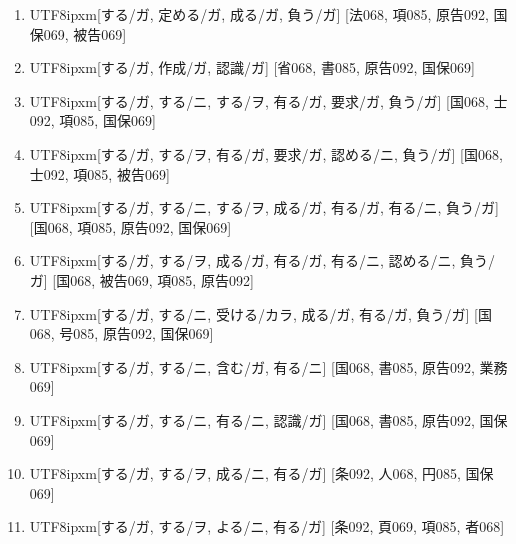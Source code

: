 \begin{enumerate}
\item \begin{CJK}{UTF8}{ipxm}[する/ガ, 定める/ガ, 成る/ガ, 負う/ガ] [法068, 項085, 原告092, 国保069, 被告069]\end{CJK}
\item \begin{CJK}{UTF8}{ipxm}[する/ガ, 作成/ガ, 認識/ガ] [省068, 書085, 原告092, 国保069]\end{CJK}
\item \begin{CJK}{UTF8}{ipxm}[する/ガ, する/ニ, する/ヲ, 有る/ガ, 要求/ガ, 負う/ガ] [国068, 士092, 項085, 国保069]\end{CJK}
\item \begin{CJK}{UTF8}{ipxm}[する/ガ, する/ヲ, 有る/ガ, 要求/ガ, 認める/ニ, 負う/ガ] [国068, 士092, 項085, 被告069]\end{CJK}
\item \begin{CJK}{UTF8}{ipxm}[する/ガ, する/ニ, する/ヲ, 成る/ガ, 有る/ガ, 有る/ニ, 負う/ガ] [国068, 項085, 原告092, 国保069]\end{CJK}
\item \begin{CJK}{UTF8}{ipxm}[する/ガ, する/ヲ, 成る/ガ, 有る/ガ, 有る/ニ, 認める/ニ, 負う/ガ] [国068, 被告069, 項085, 原告092]\end{CJK}
\item \begin{CJK}{UTF8}{ipxm}[する/ガ, する/ニ, 受ける/カラ, 成る/ガ, 有る/ガ, 負う/ガ] [国068, 号085, 原告092, 国保069]\end{CJK}
\item \begin{CJK}{UTF8}{ipxm}[する/ガ, する/ニ, 含む/ガ, 有る/ニ] [国068, 書085, 原告092, 業務069]\end{CJK}
\item \begin{CJK}{UTF8}{ipxm}[する/ガ, する/ニ, 有る/ニ, 認識/ガ] [国068, 書085, 原告092, 国保069]\end{CJK}
\item \begin{CJK}{UTF8}{ipxm}[する/ガ, する/ヲ, 成る/ニ, 有る/ガ] [条092, 人068, 円085, 国保069]\end{CJK}
\item \begin{CJK}{UTF8}{ipxm}[する/ガ, する/ヲ, よる/ニ, 有る/ガ] [条092, 頁069, 項085, 者068]\end{CJK}

\end{enumerate}
